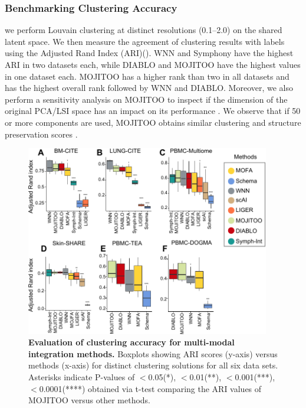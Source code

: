 \subsubsection{Benchmarking Clustering Accuracy}
we perform Louvain clustering at distinct resolutions (0.1–2.0) on the shared latent space. We then measure the agreement of clustering results with labels using the Adjusted Rand Index (ARI)(). WNN and Symphony have the highest ARI in two datasets each, while DIABLO and MOJITOO have the highest values in one dataset each. MOJITOO has a higher rank than two in all datasets and has the highest overall rank followed by WNN and DIABLO. Moreover, we also perform a sensitivity analysis on MOJITOO to inspect if the dimension of the original PCA/LSI space has an impact on its performance . We observe that if 50 or more components are used, MOJITOO obtains similar clustering and structure preservation scores .
\begin{figure}[!ht]
	\centering
	\includegraphics[width=0.95\textwidth]{ari/fig}
	\vspace{0.1cm}
	\caption[Evaluation of clustering accuracy for multi-modal integration methods.]{
	\textbf{Evaluation of clustering accuracy for multi-modal integration methods.} Boxplots showing ARI scores (y-axis) versus methods (x-axis) for distinct clustering solutions for all six data sets. Asterisks indicate P-values of $<$0.05(*), $<$0.01(**), $<$0.001(***), $<$0.0001(****) obtained via t-test comparing the ARI values of MOJITOO versus other methods. }
	\label{fig:ari}
\end{figure}

